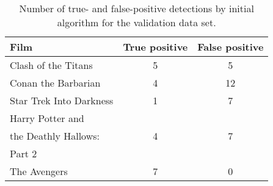 \begin{table}[!h]
	\centering
	\begin{tabular}[width=\textwidth]{lcc}
		\toprule
		Film 										&  True positive  & False positive  		 \\\toprule
		Clash of the Titans 			& 5 								 & 5 						   \\\midrule
		Conan the Barbarian 		& 4 								 & 12 						  \\\midrule
		Star Trek Into Darkness   & 1 								    & 7 						  \\\midrule
		Harry Potter and  				&  									   &  							   \\
		the Deathly Hallows: 		 & 4 								   & 7						     \\
		Part 2 									  & 									  & 							 \\\midrule
		The Avengers 					 & 7 									& 0 						 \\\bottomrule
	\end{tabular}
    \caption{Number of true- and false-positive detections by initial algorithm for the validation data set.}
	\label{tab:testsample}
\end{table}
